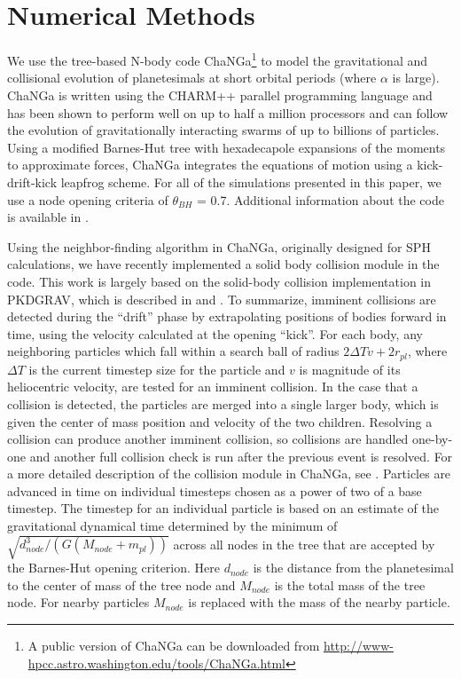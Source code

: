 \documentclass[twocolumn]{aastex63}
\begin{document}
\section{Numerical Methods}\label{sec:methods}

We use the tree-based N-body code {\sc ChaNGa}\footnote{A public version of {\sc ChaNGa} can be downloaded from \url{http://www-hpcc.astro.washington.edu/tools/ChaNGa.html}} to model the gravitational and collisional evolution of planetesimals at short orbital periods (where $\alpha$ is large). {\sc ChaNGa} is written using the {\sc CHARM++} parallel programming language and has been shown to perform well on up to half a million processors \citep{menon15} and can follow the evolution of gravitationally interacting swarms of up to billions of particles. Using a modified Barnes-Hut tree with hexadecapole expansions of the moments to approximate forces, {\sc ChaNGa} integrates the equations of motion using a kick-drift-kick leapfrog scheme. For all of the simulations presented in this paper, we use a node opening criteria of $\theta_{BH}$ = 0.7. Additional information about the code is available in \citep{jetley08,menon15}.

Using the neighbor-finding algorithm in {\sc ChaNGa}, originally
designed for SPH calculations, we have recently implemented a solid
body collision module in the code.  This work is largely based on the
solid-body collision implementation in {\sc PKDGRAV}, which is
described in \citet{richardson94} and \citet{richardson00}. To
summarize, imminent collisions are detected during the ``drift'' phase
by extrapolating positions of bodies forward in time, using the
velocity calculated at the opening ``kick''. For each body, any
neighboring particles which fall within a search ball of radius
$2 \Delta T v + 2 r_{pl}$, where $\Delta T$ is the current timestep size
for the particle and $v$ is magnitude of its heliocentric velocity,
 are tested for an imminent collision. In the case that
a collision is detected, the particles are merged into a single larger
body, which is given the center of mass position and velocity of the
two children. Resolving a collision can produce another imminent
collision, so collisions are handled one-by-one and another full
collision check is run after the previous event is resolved. For a
more detailed description of the collision module in {\sc ChaNGa}, see
\citep{wallace19}.
Particles are advanced in time on individual timesteps chosen as a
power of two of a base timestep.  The timestep for an individual
particle is based on an estimate of the gravitational dynamical time
determined by the minimum of $\sqrt{d_{node}^3/(G(M_{node} + m_{pl}))}$
across all nodes in the tree that are accepted by the Barnes-Hut
opening criterion.  Here $d_{node}$ is the distance from the
planetesimal to the center of mass of the tree node and $M_{node}$ is
the total mass of the tree node.  For nearby particles $M_{node}$ is
replaced with the mass of the nearby particle.
\end{document}
